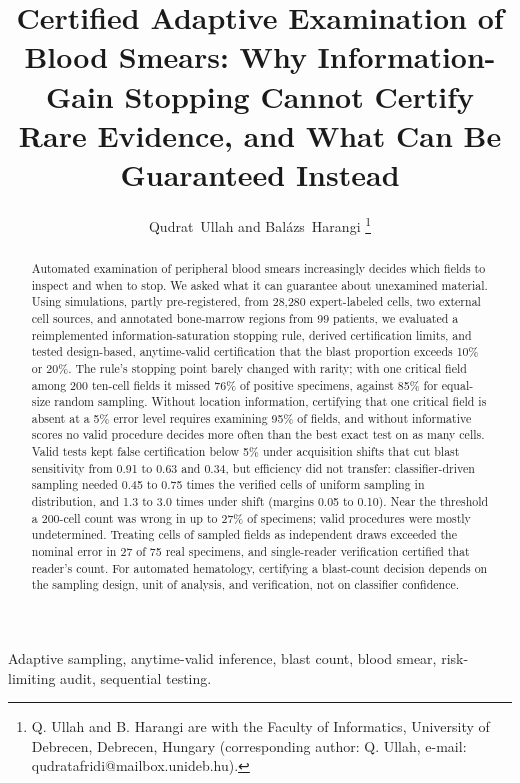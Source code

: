 \documentclass[journal]{IEEEtran}
\begin{document}
\title{Certified Adaptive Examination of Blood Smears: Why Information-Gain Stopping Cannot Certify Rare Evidence, and What Can Be Guaranteed Instead}
\author{Qudrat~Ullah and Bal\'azs~Harangi%
\thanks{Q. Ullah and B. Harangi are with the Faculty of Informatics, University of Debrecen, Debrecen, Hungary (corresponding author: Q. Ullah, e-mail: qudratafridi@mailbox.unideb.hu).}}
\maketitle

\begin{abstract}
Automated examination of peripheral blood smears increasingly decides which fields to inspect and when to stop. We asked what it can guarantee about unexamined material. Using simulations, partly pre-registered, from 28,280 expert-labeled cells, two external cell sources, and annotated bone-marrow regions from 99 patients, we evaluated a reimplemented information-saturation stopping rule, derived certification limits, and tested design-based, anytime-valid certification that the blast proportion exceeds 10\% or 20\%. The rule's stopping point barely changed with rarity; with one critical field among 200 ten-cell fields it missed 76\% of positive specimens, against 85\% for equal-size random sampling. Without location information, certifying that one critical field is absent at a 5\% error level requires examining 95\% of fields, and without informative scores no valid procedure decides more often than the best exact test on as many cells. Valid tests kept false certification below 5\% under acquisition shifts that cut blast sensitivity from 0.91 to 0.63 and 0.34, but efficiency did not transfer: classifier-driven sampling needed 0.45 to 0.75 times the verified cells of uniform sampling in distribution, and 1.3 to 3.0 times under shift (margins 0.05 to 0.10). Near the threshold a 200-cell count was wrong in up to 27\% of specimens; valid procedures were mostly undetermined. Treating cells of sampled fields as independent draws exceeded the nominal error in 27 of 75 real specimens, and single-reader verification certified that reader's count. For automated hematology, certifying a blast-count decision depends on the sampling design, unit of analysis, and verification, not on classifier confidence.
\end{abstract}

\begin{IEEEkeywords}
Adaptive sampling, anytime-valid inference, blast count, blood smear, risk-limiting audit, sequential testing.
\end{IEEEkeywords}
\end{document}

